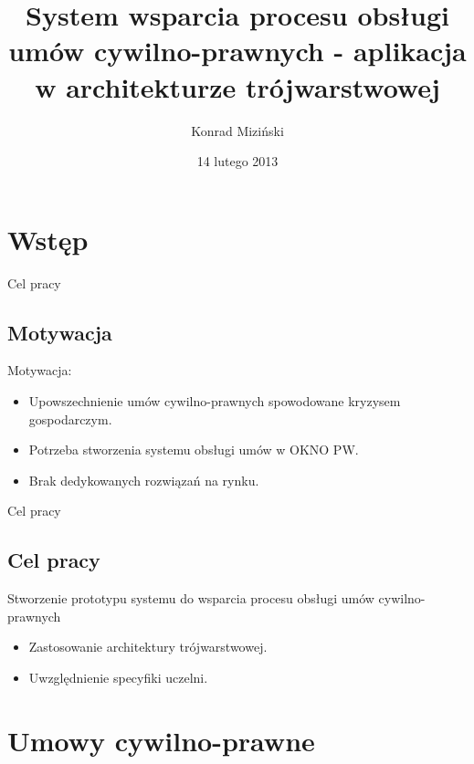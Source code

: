 \documentclass[10pt,utf8]{beamer}
\date{14 lutego 2013}
\begin{document}
%
\title[System wsparcia procesu obsługi umów cywilno-prawnych - aplikacja w architekturze trójwarstwowej]{System wsparcia procesu obsługi umów cywilno-prawnych - aplikacja w architekturze trójwarstwowej}
\author{Konrad Miziński}
%

\begin{frame} %
\titlepage %
\end{frame}
\begin{frame}
\tableofcontents
\end{frame}

\section{Wstęp}

\begin{frame}{Cel pracy}
	\subsection{Motywacja}
	Motywacja:
	\begin{itemize}
		\item Upowszechnienie umów cywilno-prawnych spowodowane kryzysem gospodarczym.
		\item Potrzeba stworzenia systemu obsługi umów w OKNO PW.
		\item Brak dedykowanych rozwiązań na rynku.
	\end{itemize}
\end{frame}
\begin{frame}{Cel pracy}
	\subsection{Cel pracy}
	Stworzenie prototypu systemu do wsparcia procesu obsługi umów cywilno-prawnych
	\begin{itemize}
		\item Zastosowanie architektury trójwarstwowej.
		\item Uwzględnienie specyfiki uczelni.
	\end{itemize}
\end{frame}

\section{Umowy cywilno-prawne}
\end{document}
